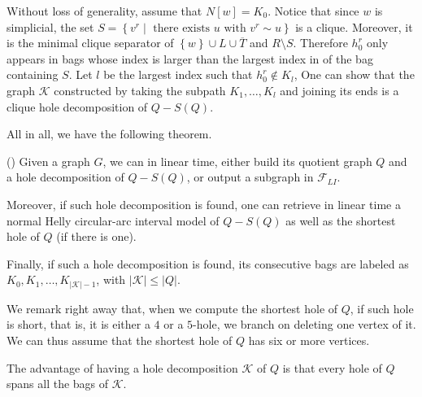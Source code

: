\documentclass{article}
\begin{document}
    Without loss of generality,
    assume that $N\left[w\right] = K_0$.
    Notice that since $w$ is
    simplicial, the set
    $S = \left\{v^{r} \mid \text{ there exists
    $u$ with } v^{r} \sim u\right\}$ 
    is a clique. Moreover, 
    it is the minimal 
    clique separator of
    $\left\{w\right\} \cup L \cup \overline{T}$
    and $R \setminus S$.
    Therefore $h_0^{r}$ 
    only appears in bags
    whose index is larger
    than the largest index in
    of the bag containing $S$.
    Let $l$ be the largest
    index such that $h_0^{r} \not\in K_{l}$,
    One can show that the graph $\mathcal{K}$
    constructed by taking
    the subpath $K_1, \ldots, K_{l}$ 
    and joining its ends is
    a clique hole decomposition
    of $Q - S\left(Q\right)$.
    
    All in all, we have the following 
    theorem.

    \begin{thm} (\cite{main})
        Given a graph $G$, we
        can in linear time, either
        build its quotient graph
        $Q$ and a hole decomposition
        of $Q - S\left(Q\right)$,
        or output a subgraph
        in $\mathcal{F}_{LI}$.
        
        Moreover, if such hole
        decomposition is found,
        one can retrieve in linear
        time a normal Helly
        circular-arc
        interval model of $Q - S\left(Q\right)$
        as well as the shortest hole 
        of $Q$ (if there is one).
    
        Finally, if such a hole 
        decomposition is found,
        its consecutive bags are
        labeled as $K_0, K_1, \ldots, K_{\left|\mathcal{K}\right|-1}$,
        with $\left|\mathcal{K}\right| \leq \left|Q\right|$.
        \label{olive-ring}
    \end{thm}

    We remark right away
    that, when we compute
    the shortest hole of $Q$,
    if such hole is short,
    that is, it is either 
    a $4$ or a $5$-hole, 
    we branch on deleting one vertex of it.
    We can thus assume
    that the shortest
    hole of $Q$ has
    six or more vertices.
        
    The advantage of having a hole
    decomposition $\mathcal{K}$ of $Q$ is 
    that every hole of $Q$
    spans all the bags of $\mathcal{K}$.
\end{document}
